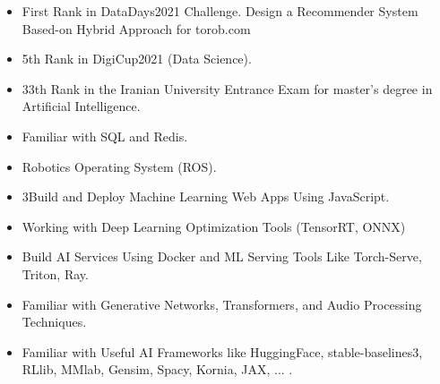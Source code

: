 \documentclass[9pt]{developercv} %
\begin{document}
\renewcommand\labelitemi{\large$\bullet$}
\begin{itemize}

\item First Rank in DataDays2021 Challenge. Design a Recommender System Based-on Hybrid Approach for torob.com

\item 5th Rank in DigiCup2021 (Data Science).

\item 33th Rank in the Iranian University Entrance Exam for master’s degree in Artificial Intelligence.
\end{itemize}





\renewcommand\labelitemi{\large$\bullet$}
\begin{itemize}

\item Familiar with SQL and Redis.

\item Robotics Operating System (ROS).

\item 3Build and Deploy Machine Learning Web Apps Using JavaScript.

\item Working with Deep Learning Optimization Tools (TensorRT, ONNX)

\item Build AI Services Using Docker and ML Serving Tools Like Torch-Serve, Triton, Ray.

\item Familiar with Generative Networks, Transformers, and Audio Processing Techniques.

\item Familiar with Useful AI Frameworks like HuggingFace, stable-baselines3, RLlib, MMlab, Gensim, Spacy, Kornia, JAX, ... .

\end{itemize}




\end{document}
